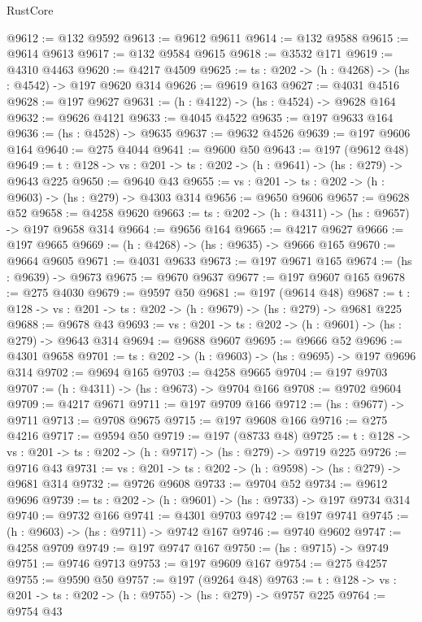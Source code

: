 \begin{lexlean}{RustCore}
\begin{coremodule}
@9612 := @132 @9592
@9613 := @9612 @9611
@9614 := @132 @9588
@9615 := @9614 @9613
@9617 := @132 @9584 @9615
@9618 := @3532 @171
@9619 := @4310 @4463
@9620 := @4217 @4509
@9625 := {ts : @202} -> (h : @4268) -> (hs : @4542) -> @197 @9620 @314
@9626 := @9619 @163
@9627 := @4031 @4516
@9628 := @197 @9627
@9631 := (h : @4122) -> (hs : @4524) -> @9628 @164
@9632 := @9626 @4121
@9633 := @4045 @4522
@9635 := @197 @9633 @164
@9636 := (hs : @4528) -> @9635
@9637 := @9632 @4526
@9639 := @197 @9606 @164
@9640 := @275 @4044
@9641 := @9600 @50
@9643 := @197 (@9612 @48)
@9649 := {t : @128} -> {vs : @201} -> {ts : @202} -> (h : @9641) -> (hs : @279) -> @9643 @225
@9650 := @9640 @43
@9655 := {vs : @201} -> {ts : @202} -> (h : @9603) -> (hs : @279) -> @4303 @314
@9656 := @9650 @9606
@9657 := @9628 @52
@9658 := @4258 @9620
@9663 := {ts : @202} -> (h : @4311) -> (hs : @9657) -> @197 @9658 @314
@9664 := @9656 @164
@9665 := @4217 @9627
@9666 := @197 @9665
@9669 := (h : @4268) -> (hs : @9635) -> @9666 @165
@9670 := @9664 @9605
@9671 := @4031 @9633
@9673 := @197 @9671 @165
@9674 := (hs : @9639) -> @9673
@9675 := @9670 @9637
@9677 := @197 @9607 @165
@9678 := @275 @4030
@9679 := @9597 @50
@9681 := @197 (@9614 @48)
@9687 := {t : @128} -> {vs : @201} -> {ts : @202} -> (h : @9679) -> (hs : @279) -> @9681 @225
@9688 := @9678 @43
@9693 := {vs : @201} -> {ts : @202} -> (h : @9601) -> (hs : @279) -> @9643 @314
@9694 := @9688 @9607
@9695 := @9666 @52
@9696 := @4301 @9658
@9701 := {ts : @202} -> (h : @9603) -> (hs : @9695) -> @197 @9696 @314
@9702 := @9694 @165
@9703 := @4258 @9665
@9704 := @197 @9703
@9707 := (h : @4311) -> (hs : @9673) -> @9704 @166
@9708 := @9702 @9604
@9709 := @4217 @9671
@9711 := @197 @9709 @166
@9712 := (hs : @9677) -> @9711
@9713 := @9708 @9675
@9715 := @197 @9608 @166
@9716 := @275 @4216
@9717 := @9594 @50
@9719 := @197 (@8733 @48)
@9725 := {t : @128} -> {vs : @201} -> {ts : @202} -> (h : @9717) -> (hs : @279) -> @9719 @225
@9726 := @9716 @43
@9731 := {vs : @201} -> {ts : @202} -> (h : @9598) -> (hs : @279) -> @9681 @314
@9732 := @9726 @9608
@9733 := @9704 @52
@9734 := @9612 @9696
@9739 := {ts : @202} -> (h : @9601) -> (hs : @9733) -> @197 @9734 @314
@9740 := @9732 @166
@9741 := @4301 @9703
@9742 := @197 @9741
@9745 := (h : @9603) -> (hs : @9711) -> @9742 @167
@9746 := @9740 @9602
@9747 := @4258 @9709
@9749 := @197 @9747 @167
@9750 := (hs : @9715) -> @9749
@9751 := @9746 @9713
@9753 := @197 @9609 @167
@9754 := @275 @4257
@9755 := @9590 @50
@9757 := @197 (@9264 @48)
@9763 := {t : @128} -> {vs : @201} -> {ts : @202} -> (h : @9755) -> (hs : @279) -> @9757 @225
@9764 := @9754 @43

\end{coremodule}
\end{lexlean}
